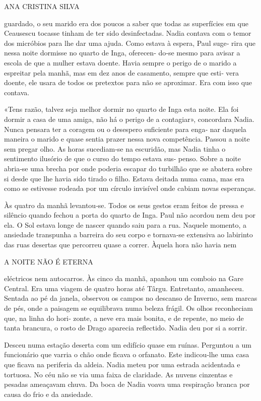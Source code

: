ANA CRISTINA SILVA

guardado, o seu marido era dos poucos a saber que todas as superfícies
em que Ceausescu tocasse tinham de ter sido desinfectadas. Nadia contava
com o temor dos micróbios para lhe dar uma ajuda. Como estava à espera,
Paul suge‑ rira que nessa noite dormisse no quarto de Inga, oferecen‑
do‑se mesmo para avisar a escola de que a mulher estava doente. Havia
sempre o perigo de o marido a espreitar pela manhã, mas em dez anos de
casamento, sempre que esti‑ vera doente, ele usara de todos os pretextos
para não se aproximar. Era com isso que contava.

«Tens razão, talvez seja melhor dormir no quarto de Inga esta noite. Ela
foi dormir a casa de uma amiga, não há o perigo de a contagiar»,
concordara Nadia. Nunca pensara ter a coragem ou o desespero suficiente
para enga‑ nar daquela maneira o marido e quase sentia prazer nessa nova
competência. Passou a noite sem pregar olho. As horas sucediam‑se na
escuridão, mas Nadia tinha o sentimento ilusório de que o curso do tempo
estava sus‑ penso. Sobre a noite abria‑se uma brecha por onde poderia
escapar do turbilhão que se abatera sobre si desde que lhe havia sido
tirado o filho. Estava deitada numa cama, mas era como se estivesse
rodeada por um círculo invisível onde cabiam novas esperanças.

Às quatro da manhã levantou‑se. Todos os seus gestos eram feitos de
pressa e silêncio quando fechou a porta do quarto de Inga. Paul não
acordou nem deu por ela. O Sol estava longe de nascer quando saiu para a
rua. Naquele momento, a ansiedade transpunha a barreira do seu corpo e
tornava‑se extensiva ao labirinto das ruas desertas que percorreu quase
a correr. Àquela hora não havia nem

A NOITE NÃO É ETERNA

eléctricos nem autocarros. Às cinco da manhã, apanhou um comboio na Gare
Central. Era uma viagem de quatro horas até Târgu. Entretanto,
amanheceu. Sentada ao pé da janela, observou os campos no descanso de
Inverno, sem marcas de pés, onde a paisagem se equilibrava numa beleza
frágil. Os olhos reconheciam que, na linha do hori‑ zonte, a neve era
mais bonita, e de repente, no meio de tanta brancura, o rosto de Drago
aparecia reflectido. Nadia deu por si a sorrir.

Desceu numa estação deserta com um edifício quase em ruínas. Perguntou a
um funcionário que varria o chão onde ficava o orfanato. Este
indicou‑lhe uma casa que ficava na periferia da aldeia. Nadia meteu por
uma estrada acidentada e tortuosa. No céu não se via uma faixa de
claridade. As nuvens cinzentas e pesadas ameaçavam chuva. Da boca de
Nadia voava uma respiração branca por causa do frio e da ansiedade.

